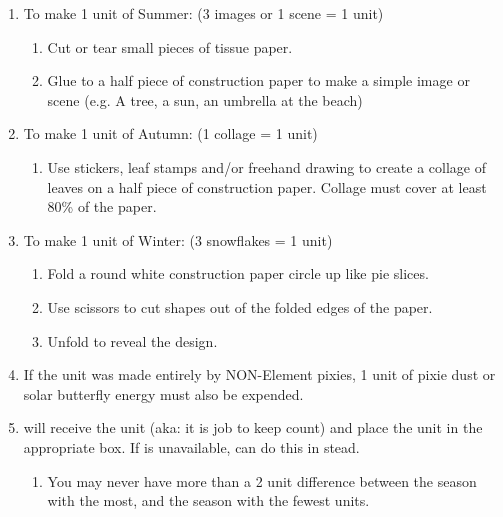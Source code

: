 \documentclass[green]{PP}
\begin{document}
\begin{enumerate}
\begin{enumerate}
	\end{enumerate}
	\item To make 1 unit of Summer: (3 images or 1 scene = 1 unit)
	\begin{enumerate}
		\item Cut or tear small pieces of tissue paper.
		\item Glue to a half piece of construction paper to make a simple image or scene (e.g. A tree, a sun, an umbrella at the beach)
	\end{enumerate}
	\item To make 1 unit of Autumn: (1 collage = 1 unit)
	\begin{enumerate}
		\item Use stickers, leaf stamps and/or freehand drawing to create a collage of leaves on a half piece of construction paper. Collage must cover at least 80\% of the paper.
	\end{enumerate}
	\item To make 1 unit of Winter: (3 snowflakes = 1 unit)
	\begin{enumerate}
		\item Fold a round white construction paper circle up like pie slices.
		\item Use scissors to cut shapes out of the folded edges of the paper.
		\item Unfold to reveal the design.
	\end{enumerate}
	\item If the unit was made entirely by NON-Element pixies, 1 unit of pixie dust or solar butterfly energy must also be expended.
	\item \cEHead{} will receive the unit (aka: it is \cEHead{\their} job to keep count) and place the unit in the appropriate box. If \cEHead{} is unavailable, \cSHead{} can do this in \cEHead{\their} stead.
	\begin{enumerate}
		\item You may never have more than a 2 unit difference between the season with the most, and the season with the fewest units.
	\end{enumerate}
\end{enumerate}
\end{document}
